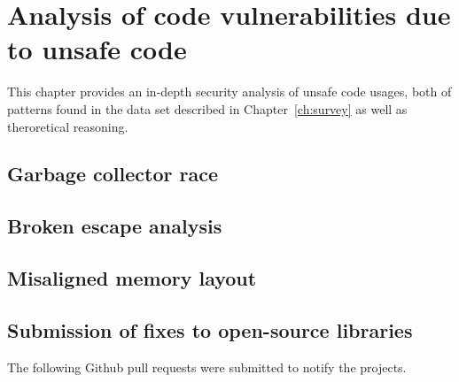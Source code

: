 
\chapter{Analysis of code vulnerabilities due to unsafe code}\label{ch:code-vulnerabilities}

This chapter provides an in-depth security analysis of unsafe code usages, both of patterns found in the data set
described in Chapter~\ref{ch:survey} as well as theroretical reasoning.



\section{Garbage collector race}\label{sec:vulnerability-gc-race}



\section{Broken escape analysis}\label{sec:vulnerability-escape-analysis}



\section{Misaligned memory layout}\label{sec:vulnerability-alignment}



\section{Submission of fixes to open-source libraries}\label{sec:vulnerability-fixes}

The following Github pull requests were submitted to notify the projects.

